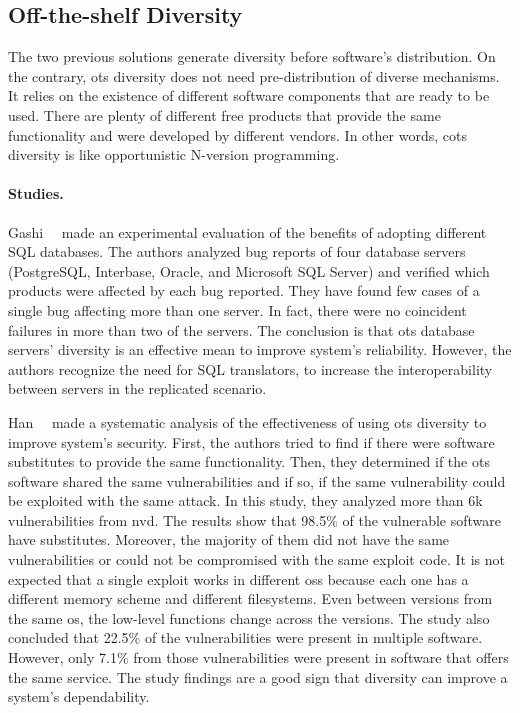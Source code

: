 \subsection{Off-the-shelf Diversity}
The two previous solutions generate diversity before software’s distribution. 
On the contrary, \gls{ots} diversity does not need pre-distribution of diverse mechanisms. 
It relies on the existence of different software components that are ready to be used.
There are plenty of different free products that provide the same functionality and were developed by different vendors. 
In other words, \gls{cots} diversity is like opportunistic N-version programming.


\paragraph{Studies.}
Gashi~\etal{}~\cite{Gashi:2007} made an experimental evaluation of the benefits of adopting different SQL databases. 
The authors analyzed bug reports of four database servers (PostgreSQL, Interbase, Oracle, and Microsoft SQL Server) and verified which products were affected by each bug reported. 
They have found few cases of a single bug affecting more than one server. 
In fact, there were no coincident failures in more than two of the servers.
The conclusion is that \gls{ots} database servers’ diversity is an effective mean to improve system's reliability. 
However, the authors recognize the need for SQL translators, to increase the interoperability between servers in the replicated scenario.

Han~\etal{}~\cite{Han:2009} made a systematic analysis of the effectiveness of using \gls{ots} diversity to improve system's security. 
First, the authors tried to find if there were software substitutes to provide the same functionality. 
Then, they determined if the \gls{ots} software shared the same vulnerabilities and if so, if the same vulnerability could be exploited with the same attack. 
In this study, they analyzed more than 6k vulnerabilities from \gls{nvd}. 
The results show that 98.5$\%$ of the vulnerable software have substitutes. 
Moreover, the majority of them did not have the same vulnerabilities or could not be compromised with the same exploit code. 
It is not expected that a single exploit works in different \glspl{os} because each one has a different memory scheme and different filesystems. 
Even between versions from the same \gls{os}, the low-level functions change across the versions. 
The study also concluded that 22.5$\%$ of the vulnerabilities were present in multiple software. 
However, only 7.1$\%$ from those vulnerabilities were present in software that offers the same service. 
The study findings are a good sign that diversity can improve a system’s dependability.


